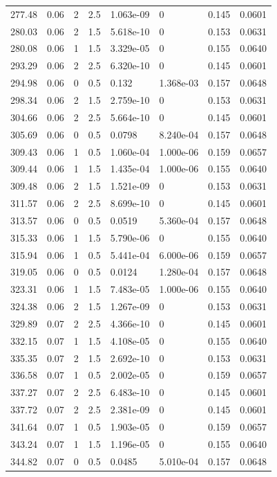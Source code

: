 \documentclass[preview]{standalone}
\begin{document}
{{{\begin{tabular}{L{1.2cm}C{1.2cm} C{0.3cm}C{0.5cm} C{1.4cm}C{1.4cm} C{1.4cm}C{1.4cm}}
  277.48  &  0.06  & 2     & 2.5 &  1.063e-09  & 0  & 0.145 &  0.0601   \\ 
  280.03  &  0.06  & 2     & 1.5 &  5.618e-10  & 0  & 0.153 &  0.0631   \\ 
  280.08  &  0.06  & 1     & 1.5 &  3.329e-05  & 0  & 0.155 &  0.0640   \\ 
  293.29  &  0.06  & 2     & 2.5 &  6.320e-10  & 0  & 0.145 &  0.0601   \\ 
  294.98  &  0.06  & 0     & 0.5 &  0.132  & 1.368e-03  & 0.157 &  0.0648   \\ 
  298.34  &  0.06  & 2     & 1.5 &  2.759e-10  & 0  & 0.153 &  0.0631   \\ 
  304.66  &  0.06  & 2     & 2.5 &  5.664e-10  & 0  & 0.145 &  0.0601   \\ 
  305.69  &  0.06  & 0     & 0.5 &  0.0798  & 8.240e-04  & 0.157 &  0.0648   \\ 
  309.43  &  0.06  & 1     & 0.5 &  1.060e-04  & 1.000e-06  & 0.159 &  0.0657   \\ 
  309.44  &  0.06  & 1     & 1.5 &  1.435e-04  & 1.000e-06  & 0.155 &  0.0640   \\ 
  309.48  &  0.06  & 2     & 1.5 &  1.521e-09  & 0  & 0.153 &  0.0631   \\ 
  311.57  &  0.06  & 2     & 2.5 &  8.699e-10  & 0  & 0.145 &  0.0601   \\ 
  313.57  &  0.06  & 0     & 0.5 &  0.0519  & 5.360e-04  & 0.157 &  0.0648   \\ 
  315.33  &  0.06  & 1     & 1.5 &  5.790e-06  & 0  & 0.155 &  0.0640   \\ 
  315.94  &  0.06  & 1     & 0.5 &  5.441e-04  & 6.000e-06  & 0.159 &  0.0657   \\ 
  319.05  &  0.06  & 0     & 0.5 &  0.0124  & 1.280e-04  & 0.157 &  0.0648   \\ 
  323.31  &  0.06  & 1     & 1.5 &  7.483e-05  & 1.000e-06  & 0.155 &  0.0640   \\ 
  324.38  &  0.06  & 2     & 1.5 &  1.267e-09  & 0  & 0.153 &  0.0631   \\ 
  329.89  &  0.07  & 2     & 2.5 &  4.366e-10  & 0  & 0.145 &  0.0601   \\ 
  332.15  &  0.07  & 1     & 1.5 &  4.108e-05  & 0  & 0.155 &  0.0640   \\ 
  335.35  &  0.07  & 2     & 1.5 &  2.692e-10  & 0  & 0.153 &  0.0631   \\ 
  336.58  &  0.07  & 1     & 0.5 &  2.002e-05  & 0  & 0.159 &  0.0657   \\ 
  337.27  &  0.07  & 2     & 2.5 &  6.483e-10  & 0  & 0.145 &  0.0601   \\ 
  337.72  &  0.07  & 2     & 2.5 &  2.381e-09  & 0  & 0.145 &  0.0601   \\ 
  341.64  &  0.07  & 1     & 0.5 &  1.903e-05  & 0  & 0.159 &  0.0657   \\ 
  343.24  &  0.07  & 1     & 1.5 &  1.196e-05  & 0  & 0.155 &  0.0640   \\ 
  344.82  &  0.07  & 0     & 0.5 &  0.0485  & 5.010e-04  & 0.157 &  0.0648   \\ 
\hline 
\end{tabular} 

}}}
\end{document}
